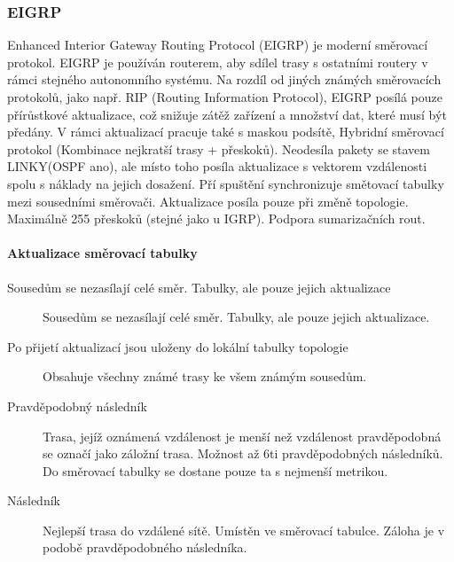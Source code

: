 \subsubsection{EIGRP}
Enhanced Interior Gateway Routing Protocol (EIGRP) je moderní směrovací protokol. EIGRP je používán routerem, aby sdílel trasy s ostatními routery v rámci stejného autonomního systému. Na rozdíl od jiných známých směrovacích protokolů, jako např. RIP (Routing Information Protocol), EIGRP posílá pouze přírůstkové aktualizace, což snižuje zátěž zařízení a množství dat, které musí být předány. V rámci aktualizací pracuje také s maskou podsítě, Hybridní směrovací protokol (Kombinace nejkratší trasy + přeskoků). Neodesíla pakety se stavem LINKY(OSPF ano), ale místo toho posíla aktualizace s vektorem vzdálenosti spolu s náklady na jejich dosažení. Pří spuštění synchronizuje smětovací tabulky mezi sousedními směrovači. Aktualizace posíla pouze při změně topologie. Maximálně 255 přeskoků (stejné jako u IGRP). Podpora sumarizačních rout. 

\paragraph{Aktualizace směrovací tabulky}
\begin{description}
    \item[Sousedům se nezasílají celé směr. Tabulky, ale pouze jejich aktualizace] Sousedům se nezasílají celé směr. Tabulky, ale pouze jejich aktualizace.
    \item[Po přijetí aktualizací jsou uloženy do lokální tabulky topologie] Obsahuje všechny známé trasy ke všem známým sousedům.
    \item[Pravděpodobný následník] Trasa, jejíž oznámená vzdálenost je menší než vzdálenost pravděpodobná se označí jako záložní trasa. Možnost až 6ti pravděpodobných následníků. Do směrovací tabulky se dostane pouze ta s nejmenší metrikou.
    \item[Následník] Nejlepší trasa do vzdálené sítě. Umístěn ve směrovací tabulce. Záloha je v podobě pravděpodobného následníka.
\end{description}

